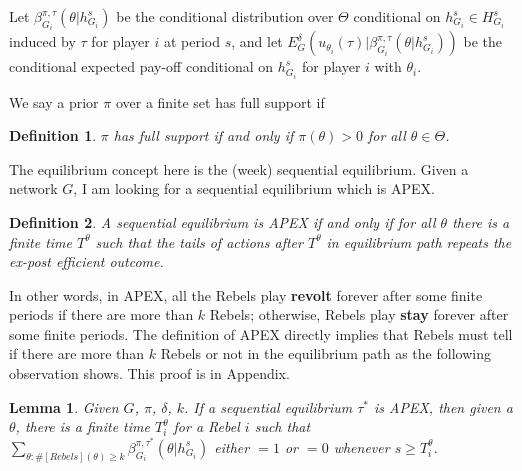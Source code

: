 \documentclass[12pt,letter]{article}
\newtheorem{lemma}{Lemma}[section]
\newtheorem{definition}{Definition}[section]
\theoremstyle{definition}
\theoremstyle{remark}
\theoremstyle{claim}
\begin{document}
Let 
$\beta^{\pi,\tau}_{G_i}(\theta|h^{s}_{G_i})$
be the conditional distribution over $\Theta$ conditional on $h^{s}_{G_i}\in H^s_{G_i}$ induced by $\tau$ for player $i$ at period $s$, and let
$E^{\delta}_G(u_{\theta_i}(\tau)|\beta^{\pi,\tau}_{G_i}(\theta|h^{s}_{G_i}))$
be the conditional expected pay-off conditional on $h^{s}_{G_i}$ for player $i$ with ${\theta_i}$.

We say a prior $\pi$ over a finite set has full support if  
\begin{definition}
$\pi$ has full support if and only if $\pi(\theta)>0$ for all $\theta\in \Theta$.
\end{definition}

The equilibrium concept here is the (week) sequential equilibrium. Given a network $G$, I am looking for a sequential equilibrium which is APEX. 

\begin{definition}\label{Def_expost_efficient}
A sequential equilibrium is APEX if and only if for all $\theta$ there is a finite time $T^{\theta}$ such that the tails of actions after $T^{\theta}$ in equilibrium path repeats the ex-post efficient outcome.
\end{definition}

In other words, in APEX, all the Rebels play \textbf{revolt} forever after some finite periods if there are more than $k$ Rebels; otherwise, Rebels play \textbf{stay} forever after some finite periods. The definition of APEX directly implies that Rebels must tell if there are more than $k$ Rebels or not in the equilibrium path as the following observation shows. This proof is in Appendix.

\begin{lemma}\label{lemma_learn}
Given $G$, $\pi$, $\delta$, $k$. If a sequential equilibrium $\tau^*$ is APEX, then given a $\theta$, there is a finite time $T^{\theta}_i$ for a Rebel $i$ such that $\sum_{\theta:\#[Rebels](\theta)\geq k}\beta^{\pi,\tau^*}_{G_i}(\theta|h^{s}_{G_i})$ either $=1$ or $=0$
whenever $s\geq T^{\theta}_i$.
\end{lemma}
\end{document}
